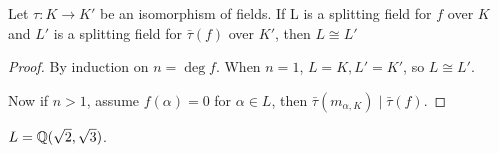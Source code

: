 \begin{theorem}
  Let $\tau: K \to K'$ be an isomorphism of fields.
  If L is a splitting field for $f$ over $K$ and $L'$ is a splitting field for $\bar\tau(f)$
  over $K'$, then $L \cong L'$
\end{theorem}

\begin{proof}
  By induction on $n = \deg f$. When $n = 1$, $L = K, L' = K'$, so $L \cong L'$.

  Now if $n > 1$, assume $f(\alpha) = 0$ for $\alpha \in L$, then $\bar\tau(m_{\alpha, K}) \mid \bar\tau(f)$.
\end{proof}

\begin{example}
  $L = \mathbb{Q}(\sqrt{2}, \sqrt{3})$.
\end{example}
